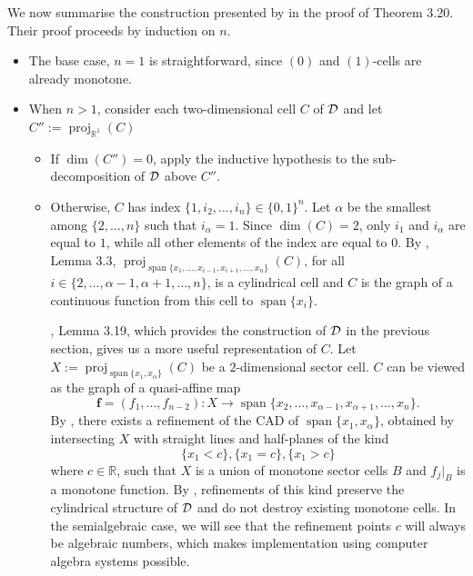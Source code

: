 \documentclass[
]{book}
\theoremstyle{definition}
\theoremstyle{definition}
\theoremstyle{definition}
\theoremstyle{definition}
\theoremstyle{remark}
\begin{document}
We now summarise the construction presented by \citet{bgv15} in the proof of Theorem 3.20.
Their proof proceeds by induction on \(n\).

\begin{itemize}
\item
  The base case, \(n=1\) is straightforward, since \((0)\) and \((1)\)-cells are already monotone.
\item
  When \(n>1\), consider each two-dimensional cell \(C\) of \(\cal D\) and let \(C'' := {\operatorname{proj}_{\mathbb{R}^{1}}}(C)\)

  \begin{itemize}
  \item
    If \(\dim(C'') = 0\), apply the inductive hypothesis to the sub-decomposition of \(\cal D\) above \(C''\).
  \item
    Otherwise, \(C\) has index \(\{1,i_2,\dots,i_n\} \in \{0,1\}^n\). Let \(\alpha\) be the smallest among \(\{2,\dots,n\}\) such that \(i_\alpha = 1\). Since \(\dim(C) = 2\), only \(i_1\) and \(i_\alpha\) are equal to \(1\), while all other elements of the index are equal to \(0\). By \citet{bgv15}, Lemma 3.3, \({\operatorname{proj}_{{\operatorname{span} \{x_1,\ldots,x_{i-1},x_{i+1},\ldots,x_n\}}}}(C)\), for all \(i \in \{2,\ldots,\alpha-1,\alpha+1,\ldots,n\}\), is a cylindrical cell and \(C\) is the graph of a continuous function from this cell to \({\operatorname{span} \{x_i\}}\).

    \citet{bgv15}, Lemma 3.19, which provides the construction of \(\cal D\) in the previous section, gives us a more useful representation of \(C\). Let \(X := {\operatorname{proj}_{{\operatorname{span} \{x_1,x_\alpha\}}}}(C)\) be a \(2\)-dimensional sector cell. \(C\) can be viewed as the graph of a quasi-affine map
    \[
    \mathbf{f} = (f_1,\dots,f_{n-2}) : X \to {\operatorname{span} \{x_2,\ldots,x_{\alpha - 1}, x_{\alpha+1},\ldots,x_n\}}.
    \]
    By \citep[Lemma 3.18]{bgv15}, there exists a refinement of the CAD of \({\operatorname{span} \{x_1,x_\alpha\}}\), obtained by intersecting \(X\) with straight lines and half-planes of the kind
    \[
    \{x_1 < c\}, \{x_1 = c\}, \{x_1 > c\}
    \]
    where \(c \in \mathbb{R}\), such that \(X\) is a union of monotone sector cells \(B\) and \(f_j\vert_B\) is a monotone function.
    By \citep[ Lemma 3.11]{bgv15}, refinements of this kind preserve the cylindrical structure of \(\cal D\) and do not destroy existing monotone cells.
    In the semialgebraic case, we will see that the refinement points \(c\) will always be algebraic numbers, which makes implementation using computer algebra systems possible.
  \end{itemize}
\end{itemize}
\end{document}
